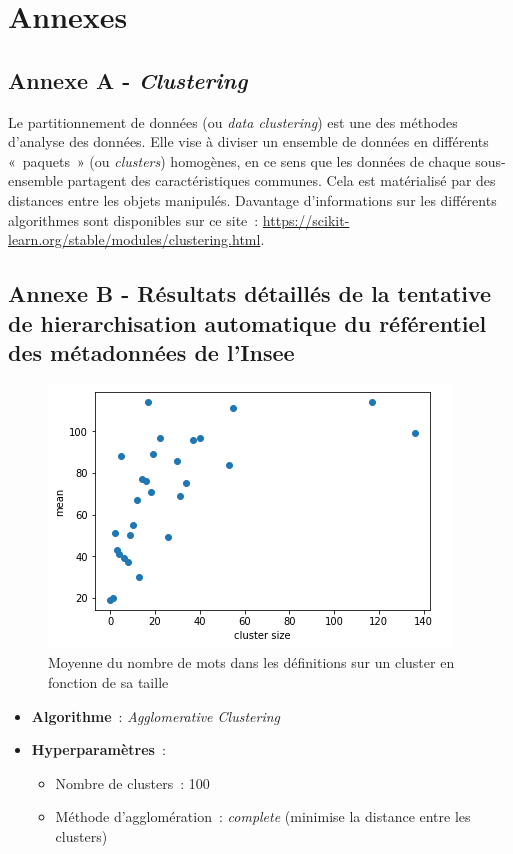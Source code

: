 \section*{Annexes}

\subsection*{Annexe A - \textit{Clustering}}
Le partitionnement de données (ou \textit{data clustering}) est une des méthodes d'analyse des données. Elle vise à diviser un ensemble de données en différents «~paquets~» (ou \textit{clusters}) homogènes, en ce sens que les données de chaque sous-ensemble partagent des caractéristiques communes. Cela est matérialisé par des distances entre les objets manipulés. Davantage d'informations sur les différents algorithmes sont disponibles sur ce site~: \href{https://scikit-learn.org/stable/modules/clustering.html}{https://scikit-learn.org/stable/modules/clustering.html}.
\label{clustering}
\newpage

\subsection*{Annexe B - Résultats détaillés de la tentative de hierarchisation automatique du référentiel des métadonnées de l'Insee}

\begin{figure}[H]
    \centering
    \includegraphics{images/hierarchisation-plot.png}
    \caption{Moyenne du nombre de mots dans les définitions sur un cluster en fonction de sa taille}
    \label{fig:hierarchisation}
\end{figure}

\begin{itemize}
    \item \textbf{Algorithme}~: \textit{Agglomerative Clustering}
    \item \textbf{Hyperparamètres}~: 
    \begin{itemize}
        \item Nombre de clusters~: 100
        \item Méthode d'agglomération~: \textit{complete} (minimise la distance entre les clusters)
        \newline
    \end{itemize}
\end{itemize}

